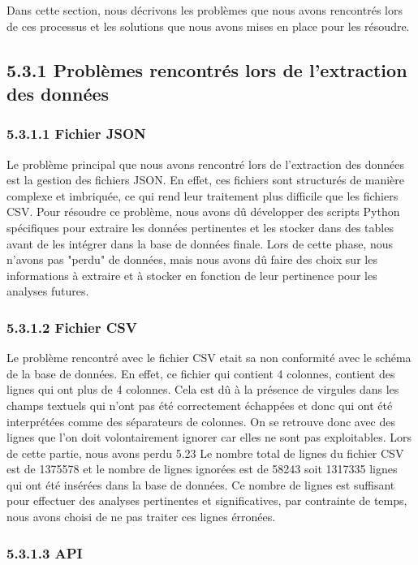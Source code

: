 Dans cette section, nous décrivons les problèmes que nous avons rencontrés lors de ces processus et les solutions que nous avons mises en place pour les résoudre.

\subsection{5.3.1 Problèmes rencontrés lors de l'extraction des données}


\subsubsection{5.3.1.1 Fichier JSON}

Le problème principal que nous avons rencontré lors de l'extraction des données est la gestion des fichiers JSON.
En effet, ces fichiers sont structurés de manière complexe et imbriquée, ce qui rend leur traitement plus difficile que les fichiers CSV.
Pour résoudre ce problème, nous avons dû développer des scripts Python spécifiques pour extraire les données pertinentes et les stocker dans des tables avant de les intégrer dans la base de données finale.
Lors de cette phase, nous n'avons pas "perdu" de données, mais nous avons dû faire des choix sur les informations à extraire et à stocker en fonction de leur pertinence pour les analyses futures.

\subsubsection{5.3.1.2 Fichier CSV}

Le problème rencontré avec le fichier CSV etait sa non conformité avec le schéma de la base de données.
En effet, ce fichier qui contient 4 colonnes, contient des lignes qui ont plus de 4 colonnes.
Cela est dû à la présence de virgules dans les champs textuels qui n'ont pas été correctement échappées et donc qui ont été interprétées comme des séparateurs de colonnes.
On se retrouve donc avec des lignes que l'on doit volontairement ignorer car elles ne sont pas exploitables.
Lors de cette partie, nous avons perdu 5.23%
Le nombre total de lignes du fichier CSV est de 1375578 et le nombre de lignes ignorées est de 58243 soit 1317335 lignes qui ont été insérées dans la base de données.
Ce nombre de lignes est suffisant pour effectuer des analyses pertinentes et significatives, par contrainte de temps, nous avons choisi de ne pas traiter ces lignes érronées.


\subsubsection{5.3.1.3 API}

